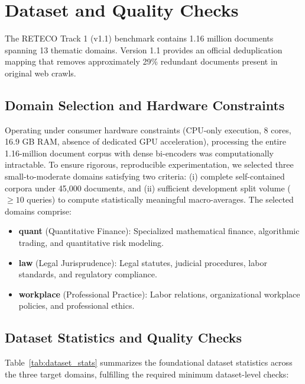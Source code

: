 \section{Dataset and Quality Checks}
\label{sec:dataset}

The RETECO Track 1 (v1.1) benchmark contains 1.16 million documents spanning 13 thematic domains. Version 1.1 provides an official deduplication mapping that removes approximately 29\% redundant documents present in original web crawls.

\subsection{Domain Selection and Hardware Constraints}
Operating under consumer hardware constraints (CPU-only execution, 8 cores, 16.9 GB RAM, absence of dedicated GPU acceleration), processing the entire 1.16-million document corpus with dense bi-encoders was computationally intractable. To ensure rigorous, reproducible experimentation, we selected three small-to-moderate domains satisfying two criteria: (i) complete self-contained corpora under 45,000 documents, and (ii) sufficient development split volume ($\ge 10$ queries) to compute statistically meaningful macro-averages. The selected domains comprise:
\begin{itemize}
    \item \textbf{quant} (Quantitative Finance): Specialized mathematical finance, algorithmic trading, and quantitative risk modeling.
    \item \textbf{law} (Legal Jurisprudence): Legal statutes, judicial procedures, labor standards, and regulatory compliance.
    \item \textbf{workplace} (Professional Practice): Labor relations, organizational workplace policies, and professional ethics.
\end{itemize}

\subsection{Dataset Statistics and Quality Checks}
Table~\ref{tab:dataset_stats} summarizes the foundational dataset statistics across the three target domains, fulfilling the required minimum dataset-level checks:

